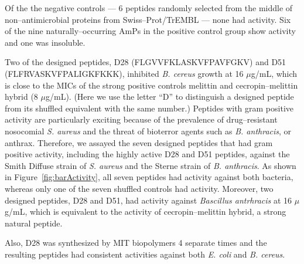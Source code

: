 


    Of the the negative controls --- 6
    peptides randomly selected from the middle of
    non--antimicrobial proteins from Swiss--Prot/TrEMBL
    --- none had activity.  Six of the nine
    naturally--occurring AmPs in the positive control
    group show activity and one was insoluble.


Two of the designed peptides, D28 (FLGVVFKLASKVFPAVFGKV) and D51
(FLFRVASKVFPALIGKFKKK), inhibited \emph{B. cereus} growth at 16
$\mu$g/mL, which is close to the MICs of the strong positive
controls melittin and cecropin--melittin hybrid (8 $\mu$g/mL). (Here
we use the letter ``D'' to distinguish a designed peptide from its
shuffled equivalent with the same number.)  Peptides with gram
positive activity are particularly exciting because of the
prevalence of drug--resistant nosocomial \emph{S. aureus} and the
threat of bioterror agents such as \emph{B. anthracis}, or anthrax.
Therefore, we assayed the seven designed peptides that had gram
positive activity, including the highly active D28 and D51 peptides,
against the Smith Diffuse strain of \emph{S. aureus} and the Sterne
strain of \emph{B. anthracis}. As shown in
Figure~\vref{fig:barActivity}, all seven peptides had activity
against both bacteria, whereas only one of the seven shuffled
controls had activity.  Moreover, two designed peptides, D28 and
D51, had activity against \emph{Bascillus antrhracis} at 16
$\mu$g/mL, which is equivalent to the activity of cecropin--melittin
hybrid, a strong natural peptide.

Also, D28 was synthesized by MIT biopolymers 4 separate times and
the resulting peptides had consistent activities against both
\emph{E. coli} and \emph{B. cereus}.



